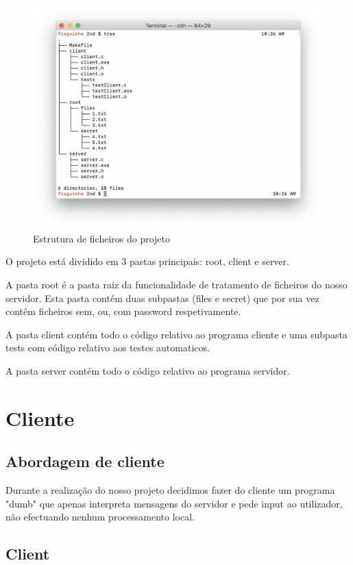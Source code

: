 \documentclass{article}
\begin{document}
\begin{figure}[htbp]
\centering
\includegraphics[width=.9\linewidth]{./img/estrutura.png}
\caption{\label{fig:estrutura}
Estrutura de ficheiros do projeto}
\end{figure}

O projeto está dividido em 3 pastas principais: root, client e server.

A pasta root é a pasta raiz da funcionalidade de tratamento de ficheiros do nosso servidor.
Esta pasta contém duas subpastas (files e secret) que por sua vez contêm ficheiros sem, ou, com password respetivamente.

A pasta client contém todo o código relativo ao programa cliente e uma subpasta tests com código relativo aos testes automaticos.

A pasta server contém todo o código relativo ao programa servidor.

\pagebreak{}
\section{Cliente}
\label{sec:org4c5ab82}

\subsection{Abordagem de cliente}
\label{sec:orgf8a1779}

Durante a realização do nosso projeto decidimos fazer do cliente um programa "dumb" que apenas interpreta mensagens do servidor e pede input ao utilizador, não efectuando nenhum processamento local.

\subsection{Client}
\label{sec:org47b48db}
\end{document}
